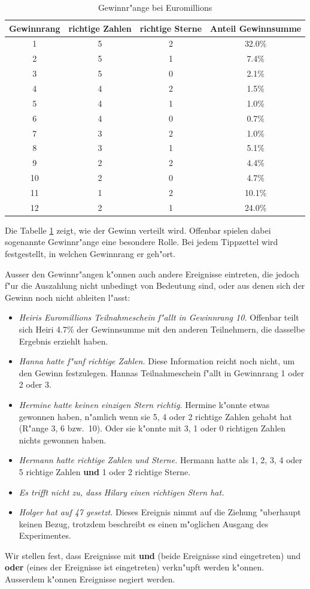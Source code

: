 \begin{table}
\begin{center}
\begin{tabular}{|c|c|c|c|}
\hline
Gewinnrang&richtige Zahlen&richtige Sterne&Anteil Gewinnsumme\\
\hline
1&5&2&32.0\%\\
2&5&1&7.4\%\\
3&5&0&2.1\%\\
4&4&2&1.5\%\\
5&4&1&1.0\%\\
6&4&0&0.7\%\\
7&3&2&1.0\%\\
8&3&1&5.1\%\\
9&2&2&4.4\%\\
10&2&0&4.7\%\\
11&1&2&10.1\%\\
12&2&1&24.0\%\\
\hline
\end{tabular}
\end{center}
\caption{Gewinnr"ange bei Euromillions\label{gewinnraenge}}
\end{table}

Die Tabelle \ref{gewinnraenge} zeigt, wie der Gewinn verteilt wird.
Offenbar spielen dabei sogenannte Gewinnr"ange eine besondere Rolle.
Bei jedem Tippzettel wird festgestellt, in welchen Gewinnrang er
geh"ort.

Ausser den Gewinnr"angen k"onnen auch andere Ereignisse eintreten,
die jedoch f"ur die Auszahlung nicht unbedingt von Bedeutung sind,
oder aus denen sich der Gewinn noch nicht ableiten l"asst:
\begin{itemize}
\item {\it Heiris Euromillions Teilnahmeschein f"allt in Gewinnrang 10.} Offenbar
teilt sich Heiri 4.7\% der Gewinnsumme mit den anderen Teilnehmern, die
dasselbe Ergebnis erziehlt haben.
\item {\it Hanna hatte f"unf richtige Zahlen.} Diese Information reicht noch
nicht, um den Gewinn festzulegen. Hannas Teilnahmeschein f"allt in
Gewinnrang 1 oder 2 oder 3.
\item {\it Hermine hatte keinen einzigen Stern richtig.} Hermine k"onnte
etwas gewonnen haben, n"amlich wenn sie 5, 4 oder 2 richtige Zahlen
gehabt hat (R"ange 3, 6 bzw.~10). Oder sie k"onnte mit 3, 1 oder 0
richtigen Zahlen nichts gewonnen haben.
\item {\it Hermann hatte richtige Zahlen und Sterne.} Hermann hatte
als 1, 2, 3, 4 oder 5 richtige Zahlen {\bf und}
1 oder 2 richtige
Sterne.
\item {\it Es trifft nicht zu, dass Hilary einen richtigen Stern hat.}
\item {\it Holger hat auf 47 gesetzt.}
Dieses Ereignis nimmt auf die Ziehung "uberhaupt keinen Bezug,
trotzdem beschreibt es einen m"oglichen Ausgang des Experimentes.
\end{itemize}
Wir stellen fest, dass Ereignisse mit {\bf und} (beide Ereignisse sind
eingetreten) und {\bf oder} (eines der Ereignisse ist
eingetreten) verkn"upft werden k"onnen. Ausserdem k"onnen 
Ereignisse negiert werden.

